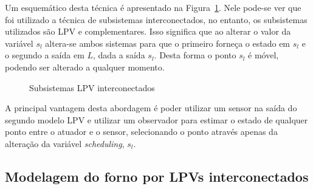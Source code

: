 Um esquemático desta técnica é apresentado na Figura~\ref{fig:nelson-system}.
Nele pode-se ver que foi utilizado a técnica de subsistemas interconectados, no
entanto, os subsistemas utilizados são \ac{LPV} e complementares. Isso significa
que ao alterar o valor da variável \( s_l \) altera-se ambos sistemas para que o
primeiro forneça o estado em \( s_l \) e o segundo a saída em \( L \), dada a
saída \( s_l \). Desta forma o ponto \( s_l \) é móvel, podendo ser alterado a
qualquer momento.

\begin{figure}[ht!]
	\centering
	\captionsetup{justification=centering}
	\caption{Subsistemas LPV interconectados}%
	\label{fig:nelson-system}
\end{figure}

A principal vantagem desta abordagem é poder utilizar um sensor na saída do
segundo modelo LPV e utilizar um observador para estimar o estado de qualquer
ponto entre o atuador e o sensor, selecionando o ponto através apenas da
alteração da variável \textit{scheduling}, \( s_l \).

\subsection{Modelagem do forno por LPVs interconectados}%
\label{subsec:lpv-oven}


